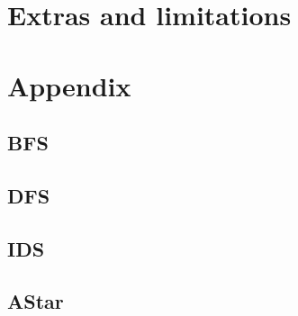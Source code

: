 \documentclass{article}
\begin{document}
\section{Extras and limitations}
\section{Appendix}
\subsection{BFS}
\subsection{DFS}
\subsection{IDS}
\subsection{AStar}





\end{document}

